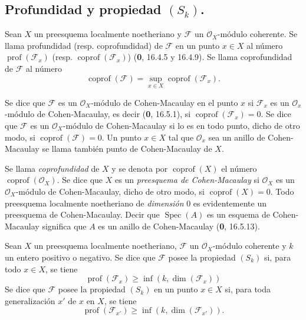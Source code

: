 \subsection{\texorpdfstring{Profundidad y propiedad $(S_k)$.}{Profundidad y propiedad (S\string_k)}}

\begin{definition}[5.7.1]
\label{IV.2.s5.7.1-fr}
Sean $X$ un preesquema localmente noetheriano y $\mathscr F$ un
$\mathcal O_X$-módulo coherente. Se llama profundidad \textup{(resp.}
coprofundidad\textup{)} de $\mathscr F$ en un punto $x\in X$ al número
$\operatorname{prof}(\mathscr F_x)$ \textup{(resp.}
$\operatorname{coprof}(\mathscr F_x)$\textup{)} \textup{(\textbf{0}, 16.4.5 y 16.4.9)}. Se llama
coprofundidad de $\mathscr F$ al número
\begin{equation}
\operatorname{coprof}(\mathscr F)
=\sup_{x\in X}\operatorname{coprof}(\mathscr F_x).
\tag{7.5.1.1}\label{IV.2.s5.7.1.1-fr}
\end{equation}

Se dice que $\mathscr F$ es un $\mathcal O_X$-módulo de Cohen-Macaulay en el
punto $x$ si $\mathscr F_x$ es un $\mathcal O_x$-módulo de Cohen-Macaulay,
es decir \textup{(\textbf{0}, 16.5.1)}, si $\operatorname{coprof}(\mathscr F_x)=0$. Se dice que
$\mathscr F$ es un $\mathcal O_X$-módulo de Cohen-Macaulay si lo es en todo
punto, dicho de otro modo, si $\operatorname{coprof}(\mathscr F)=0$. Un punto
$x\in X$ tal que $\mathcal O_x$ sea un anillo de Cohen-Macaulay se llama
también punto de Cohen-Macaulay de $X$.
\end{definition}

Se llama \emph{coprofundidad} de $X$ y se denota por
$\operatorname{coprof}(X)$ el número $\operatorname{coprof}(\mathcal O_X)$.
Se dice que $X$ es un \emph{preesquema de Cohen-Macaulay} si $\mathcal O_X$
es un $\mathcal O_X$-módulo de Cohen-Macaulay, dicho de otro modo, si
$\operatorname{coprof}(X)=0$. Todo preesquema localmente noetheriano de
\emph{dimensión} 0 es evidentemente un preesquema de Cohen-Macaulay. Decir que
$\operatorname{Spec}(A)$ es un esquema de Cohen-Macaulay significa que $A$
es un anillo de Cohen-Macaulay (\textbf 0, 16.5.13).

\begin{definition}[5.7.2]
\label{IV.2.s5.7.2-fr}
Sean $X$ un preesquema localmente noetheriano, $\mathscr F$ un
$\mathcal O_X$-módulo coherente y $k$ un entero positivo o negativo. Se dice
que $\mathscr F$ posee la propiedad $(S_k)$ si, para todo $x\in X$, se tiene
\begin{equation}
\operatorname{prof}(\mathscr F_x)\geq
\inf(k,\dim(\mathscr F_x))
\tag{5.7.2.1}\label{IV.2.s5.7.2.1-fr}
\end{equation}
Se dice que $\mathscr F$ posee la propiedad $(S_k)$ en un punto $x\in X$ si,
para toda generalización $x'$ de $x$ en $X$, se tiene
\begin{equation}
\operatorname{prof}(\mathscr F_{x'})\geq
\inf(k,\dim(\mathscr F_{x'})).
\tag{5.7.2.2}\label{IV.2.s5.7.2.2-fr}
\end{equation}
\end{definition}

